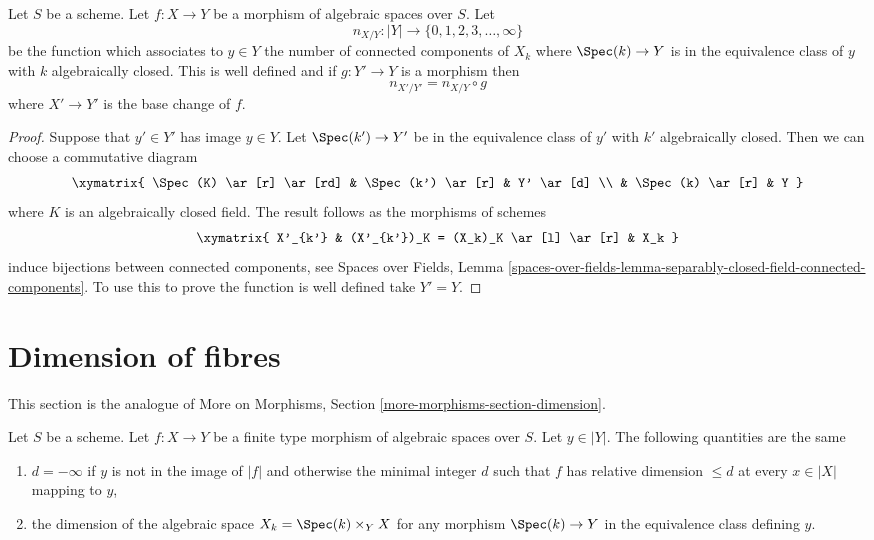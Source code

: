\begin{lemma}
\label{lemma-base-change-fibres-nr-geometrically-connected-components}
Let $S$ be a scheme.
Let $f : X \to Y$ be a morphism of algebraic spaces over $S$. Let
$$
n_{X/Y} : |Y| \to \{0, 1, 2, 3, \ldots, \infty\}
$$
be the function which associates to $y \in Y$ the number of connected
components of $X_k$ where $\Spec(k) \to Y$ is in the equivalence
class of $y$ with $k$ algebraically closed.
This is well defined and if $g : Y' \to Y$ is a morphism then
$$
n_{X'/Y'} = n_{X/Y} \circ g
$$
where $X' \to Y'$ is the base change of $f$.
\end{lemma}

\begin{proof}
Suppose that $y' \in Y'$ has image $y \in Y$. Let $\Spec(k') \to Y'$
be in the equivalence class of $y'$ with $k'$ algebraically closed.
Then we can choose a commutative diagram
$$
\xymatrix{
\Spec(K) \ar[r] \ar[rd] &
\Spec(k') \ar[r] & Y' \ar[d] \\
& \Spec(k) \ar[r] & Y
}
$$
where $K$ is an algebraically closed field.
The result follows as the morphisms of schemes
$$
\xymatrix{
X'_{k'} & (X'_{k'})_K = (X_k)_K \ar[l] \ar[r] & X_k
}
$$
induce bijections between connected components, see
Spaces over Fields, Lemma
\ref{spaces-over-fields-lemma-separably-closed-field-connected-components}.
To use this to prove the function is well defined take $Y' = Y$.
\end{proof}







\section{Dimension of fibres}
\label{section-dimension}

\noindent
This section is the analogue of
More on Morphisms, Section \ref{more-morphisms-section-dimension}.

\begin{lemma}
\label{lemma-dimension-fibre}
Let $S$ be a scheme. Let $f : X \to Y$ be a finite type morphism of
algebraic spaces over $S$. Let $y \in |Y|$. The following quantities
are the same
\begin{enumerate}
\item $d = -\infty$ if $y$ is not in the image of $|f|$ and
otherwise the minimal integer $d$ such that $f$ has relative dimension $\leq d$
at every $x \in |X|$ mapping to $y$,
\item the dimension of the algebraic space $X_k = \Spec(k) \times_Y X$
for any morphism $\Spec(k) \to Y$ in the equivalence class defining $y$.
\end{enumerate}
\end{lemma}

